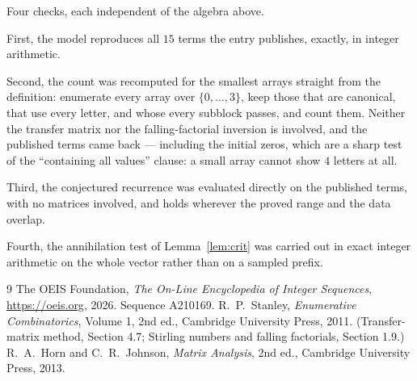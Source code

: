 \documentclass[11pt,a4paper]{article}
\theoremstyle{plain}
\theoremstyle{definition}
\begin{document}
Four checks, each independent of the algebra above.

First, the model reproduces all $15$ terms the entry publishes, exactly, in integer
arithmetic.

Second, the count was recomputed for the smallest arrays straight from the definition:
enumerate every array over $\{0,\dots,3\}$, keep those that are canonical, that use every
letter, and whose every subblock passes, and count them. Neither the transfer matrix nor the
falling-factorial inversion is involved, and the published terms came back --- including the
initial zeros, which are a sharp test of the ``containing all values'' clause: a small array
cannot show $4$ letters at all.

Third, the conjectured recurrence was evaluated directly on the published terms, with no
matrices involved, and holds wherever the proved range and the data overlap.

Fourth, the annihilation test of Lemma~\ref{lem:crit} was carried out in exact integer
arithmetic on the whole vector rather than on a sampled prefix.

\begin{thebibliography}{9}
 The OEIS Foundation, \emph{The On-Line Encyclopedia of Integer
Sequences}, \url{https://oeis.org}, 2026. Sequence A210169.
 R.~P.~Stanley, \emph{Enumerative Combinatorics}, Volume 1, 2nd ed.,
Cambridge University Press, 2011. (Transfer-matrix method, Section 4.7; Stirling numbers and
falling factorials, Section 1.9.)
 R.~A.~Horn and C.~R.~Johnson, \emph{Matrix Analysis}, 2nd ed., Cambridge
University Press, 2013.
\end{thebibliography}
\end{document}
